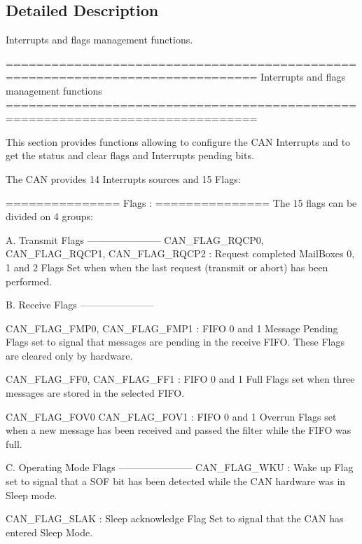 \subsection{Detailed Description}
Interrupts and flags management functions. \begin{DoxyVerb} ===============================================================================
                   Interrupts and flags management functions
 ===============================================================================  

  This section provides functions allowing to configure the CAN Interrupts and 
  to get the status and clear flags and Interrupts pending bits.
  
  The CAN provides 14 Interrupts sources and 15 Flags:

  ===============  
      Flags :
  ===============
  The 15 flags can be divided on 4 groups: 

   A. Transmit Flags
  -----------------------
        CAN_FLAG_RQCP0, 
        CAN_FLAG_RQCP1, 
        CAN_FLAG_RQCP2  : Request completed MailBoxes 0, 1 and 2  Flags
                          Set when when the last request (transmit or abort) has 
                          been performed. 

  B. Receive Flags
  -----------------------

        CAN_FLAG_FMP0,
        CAN_FLAG_FMP1   : FIFO 0 and 1 Message Pending Flags 
                          set to signal that messages are pending in the receive 
                          FIFO.
                          These Flags are cleared only by hardware. 

        CAN_FLAG_FF0,
        CAN_FLAG_FF1    : FIFO 0 and 1 Full Flags
                          set when three messages are stored in the selected 
                          FIFO.                        

        CAN_FLAG_FOV0              
        CAN_FLAG_FOV1   : FIFO 0 and 1 Overrun Flags
                          set when a new message has been received and passed 
                          the filter while the FIFO was full.         

  C. Operating Mode Flags
  ----------------------- 
        CAN_FLAG_WKU    : Wake up Flag
                          set to signal that a SOF bit has been detected while 
                          the CAN hardware was in Sleep mode. 
        
        CAN_FLAG_SLAK   : Sleep acknowledge Flag
                          Set to signal that the CAN has entered Sleep Mode. 
    

\end{DoxyVerb}
